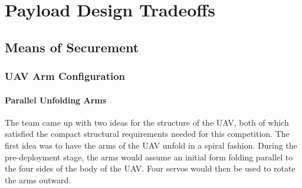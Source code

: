 \chapter{Payload Design Tradeoffs}

\section{Means of Securement}\label{PL:Tradeoffs:Securement}	
	\subsection{UAV Arm Configuration}
		\subsubsection{Parallel Unfolding Arms}
			The team came up with two ideas for the structure of the UAV, both of which satisfied the compact structural requirements needed for this competition. The first idea was to have the arms of the UAV unfold in a spiral fashion. During the pre-deployment stage, the arms would assume an initial form folding parallel to the four sides of the body of the UAV. Four servos would then be used to rotate the arms outward. 
		
